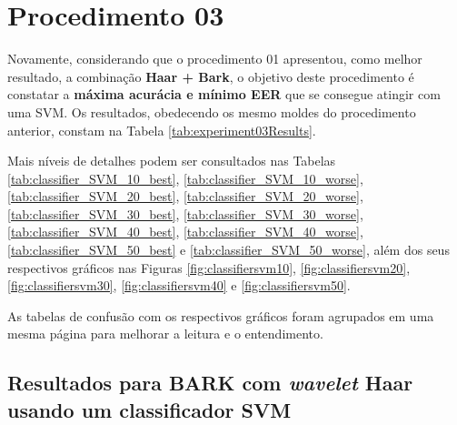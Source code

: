 	\section{Procedimento 03}
		\label{chap:testsResults:sec:Experimento03}
		\par Novamente, considerando que o procedimento 01 apresentou, como melhor resultado, a combinação \textbf{Haar + Bark}, o objetivo deste procedimento é constatar a \textbf{máxima acurácia e mínimo EER} que se consegue atingir com uma SVM. Os resultados, obedecendo os mesmo moldes do procedimento anterior, constam na Tabela \ref{tab:experiment03Results}.\\
		
		\par Mais níveis de detalhes podem ser consultados nas Tabelas \ref{tab:classifier_SVM_10_best}, \ref{tab:classifier_SVM_10_worse}, \ref{tab:classifier_SVM_20_best}, \ref{tab:classifier_SVM_20_worse}, \ref{tab:classifier_SVM_30_best}, \ref{tab:classifier_SVM_30_worse}, \ref{tab:classifier_SVM_40_best}, \ref{tab:classifier_SVM_40_worse}, \ref{tab:classifier_SVM_50_best} e \ref{tab:classifier_SVM_50_worse}, além dos seus respectivos gráficos nas Figuras \ref{fig:classifiersvm10}, \ref{fig:classifiersvm20}, \ref{fig:classifiersvm30}, \ref{fig:classifiersvm40} e \ref{fig:classifiersvm50}.

		
		
		\par As tabelas de confusão com os respectivos gráficos foram agrupados em uma mesma página para melhorar a leitura e o entendimento.

		\subsection{Resultados para BARK com \textit{wavelet} Haar usando um classificador SVM}
			
			
			
			
			

